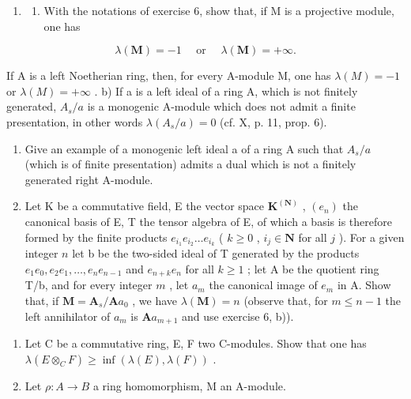 \begin{enumerate}
\def\labelenumi{\arabic{enumi})}
\setcounter{enumi}{6}
\tightlist
\item
  \begin{enumerate}
  \def\labelenumii{\alph{enumii})}
  \tightlist
  \item
    With the notations of exercise 6, show that, if M is a projective module, one has
  \end{enumerate}
\end{enumerate}

\[
\lambda (\mathbf {M}) = - 1 \quad \text { or } \quad \lambda (\mathbf {M}) = + \infty .
\]

If A is a left Noetherian ring, then, for every A-module M, one has \(\lambda(M) = -1\) or \(\lambda(M) = +\infty\) . b) If a is a left ideal of a ring A, which is not finitely generated, \(A_s/a\) is a monogenic A-module which does not admit a finite presentation, in other words \(\lambda(A_s/a) = 0\) (cf. X, p. 11, prop. 6).

\begin{enumerate}
\def\labelenumi{\alph{enumi})}
\setcounter{enumi}{2}
\item
  Give an example of a monogenic left ideal a of a ring A such that \(A_{s}/a\) (which is of finite presentation) admits a dual which is not a finitely generated right A-module.
\item
  Let K be a commutative field, E the vector space \(\mathbf{K}^{(\mathbf{N})}\) , \((e_n)\) the canonical basis of E, T the tensor algebra of E, of which a basis is therefore formed by the finite products \(e_{i_1} e_{i_2} \ldots e_{i_k}\) ( \(k \geqslant 0\) , \(i_j \in \mathbf{N}\) for all \(j\) ). For a given integer \(n\) let b be the two-sided ideal of T generated by the products \(e_1 e_0, e_2 e_1, \ldots, e_n e_{n-1}\) and \(e_{n+k} e_n\) for all \(k \geqslant 1\) ; let A be the quotient ring T/b, and for every integer \(m\) , let \(a_{m}\) the canonical image of \(e_{m}\) in A. Show that, if \(\mathbf{M} = \mathbf{A}_{s}/\mathbf{A}a_{0}\) , we have \(\lambda(\mathbf{M}) = n\) (observe that, for \(m \leqslant n - 1\) the left annihilator of \(a_{m}\) is \(\mathbf{A}a_{m+1}\) and use exercise 6, b)).
\end{enumerate}

\begin{enumerate}
\def\labelenumi{\arabic{enumi})}
\setcounter{enumi}{7}
\tightlist
\item
  Let C be a commutative ring, E, F two C-modules. Show that one has \(\lambda(E \otimes_{C} F) \geqslant \inf(\lambda(E), \lambda(F))\) .
\item
  Let \(\rho: A \to B\) a ring homomorphism, M an A-module.
\end{enumerate}

